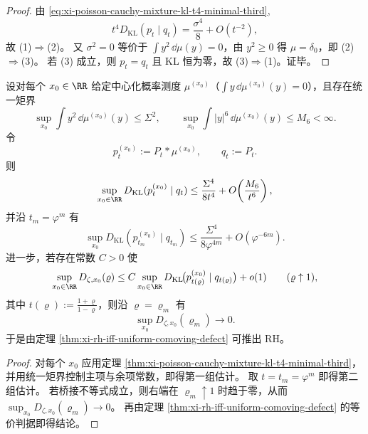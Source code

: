 \begin{proof}
由 \eqref{eq:xi-poisson-cauchy-mixture-kl-t4-minimal-third},
\[
t^4D_{\mathrm{KL}}(p_t\mid q_t)=\frac{\sigma^4}{8}+O(t^{-2}),
\]
故 (1)\(\Rightarrow\)(2)。
又 \(\sigma^2=0\) 等价于 \(\int y^2\,\dd\mu(y)=0\)，由 \(y^2\ge0\) 得 \(\mu=\delta_0\)，即 (2)\(\Rightarrow\)(3)。
若 (3) 成立，则 \(p_t=q_t\) 且 KL 恒为零，故 (3)\(\Rightarrow\)(1)。证毕。
\end{proof}

\begin{corollary}[统一矩界与桥接接口下的条件推导]\label{thm:xi-poisson-kl-bridge-variance-necessary-condition}\label{cor:xi-poisson-kl-bridge-main-channel-dichotomy}
设对每个 \(x_0\in\RR\) 给定中心化概率测度 \(\mu^{(x_0)}\)（\(\int y\,\dd\mu^{(x_0)}(y)=0\)），且存在统一矩界
\[
\sup_{x_0}\int y^2\,\dd\mu^{(x_0)}(y)\le \Sigma^2,
\qquad
\sup_{x_0}\int |y|^6\,\dd\mu^{(x_0)}(y)\le M_6<\infty.
\]
令
\[
p_t^{(x_0)}:=P_t*\mu^{(x_0)},\qquad q_t:=P_t.
\]
则
\[
\sup_{x_0\in\RR}D_{\mathrm{KL}}(p_t^{(x_0)}\mid q_t)
\le
\frac{\Sigma^4}{8t^4}
+O\!\left(\frac{M_6}{t^6}\right),
\]
并沿 \(t_m=\varphi^m\) 有
\[
\sup_{x_0}D_{\mathrm{KL}}(p_{t_m}^{(x_0)}\mid q_{t_m})
\le
\frac{\Sigma^4}{8\varphi^{4m}}
+O(\varphi^{-6m}).
\]
进一步，若存在常数 \(C>0\) 使
\[
\sup_{x_0\in\RR}D_{\zeta,x_0}(\varrho)
\le
C\sup_{x_0\in\RR}D_{\mathrm{KL}}\!\bigl(p_{t(\varrho)}^{(x_0)}\mid q_{t(\varrho)}\bigr)
+o(1)
\qquad(\varrho\uparrow1),
\]
其中 \(t(\varrho):=\frac{1+\varrho}{1-\varrho}\)，则沿 \(\varrho=\varrho_m\) 有
\[
\sup_{x_0}D_{\zeta,x_0}(\varrho_m)\to0.
\]
于是由定理 \ref{thm:xi-rh-iff-uniform-comoving-defect} 可推出 \(\mathrm{RH}\)。
\end{corollary}

\begin{proof}
对每个 \(x_0\) 应用定理 \ref{thm:xi-poisson-cauchy-mixture-kl-t4-minimal-third}，并用统一矩界控制主项与余项常数，即得第一组估计。
取 \(t=t_m=\varphi^m\) 即得第二组估计。
若桥接不等式成立，则右端在 \(\varrho_m\uparrow1\) 时趋于零，从而 \(\sup_{x_0}D_{\zeta,x_0}(\varrho_m)\to0\)。
再由定理 \ref{thm:xi-rh-iff-uniform-comoving-defect} 的等价判据即得结论。
\end{proof}

\endinput
